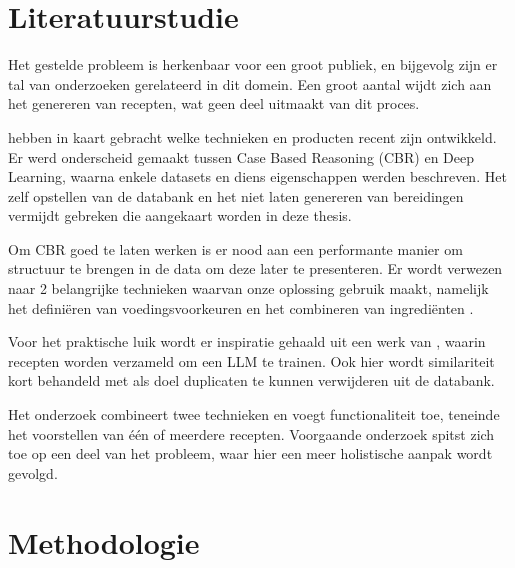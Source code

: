 \documentclass{hogent-article}
\begin{document}
\section{Literatuurstudie}%
\label{sec:literatuurstudie}


Het gestelde probleem is herkenbaar voor een groot publiek, en bijgevolg zijn er tal van onderzoeken gerelateerd in dit domein. Een groot aantal wijdt zich aan het genereren van recepten, wat geen deel uitmaakt van dit proces. 

 \textcite{Galanis2022} hebben in kaart gebracht welke technieken en producten recent zijn ontwikkeld. Er werd onderscheid gemaakt tussen Case Based Reasoning (CBR) en Deep Learning, waarna enkele datasets en diens eigenschappen werden beschreven. Het zelf opstellen van de databank en het niet laten genereren van bereidingen vermijdt gebreken die aangekaart worden in deze thesis. 

Om CBR goed te laten werken is er nood aan een performante manier om structuur te brengen in de data om deze later te presenteren. Er wordt verwezen naar 2 belangrijke technieken waarvan onze oplossing gebruik maakt, namelijk het definiëren van voedingsvoorkeuren \autocite{Ueda2011} en het combineren van ingrediënten \autocite{Yokoi2015}. 

Voor het praktische luik wordt er inspiratie gehaald uit een werk van \textcite{MichalBien2020}, waarin recepten worden verzameld om een LLM te trainen. Ook hier wordt similariteit kort behandeld met als doel duplicaten te kunnen verwijderen uit de databank.

Het onderzoek combineert twee technieken en voegt functionaliteit toe, teneinde het voorstellen van één of meerdere recepten. Voorgaande onderzoek spitst zich toe op een deel van het probleem, waar hier een meer holistische aanpak wordt gevolgd.


\section{Methodologie}%
\label{sec:methodologie}
\end{document}
